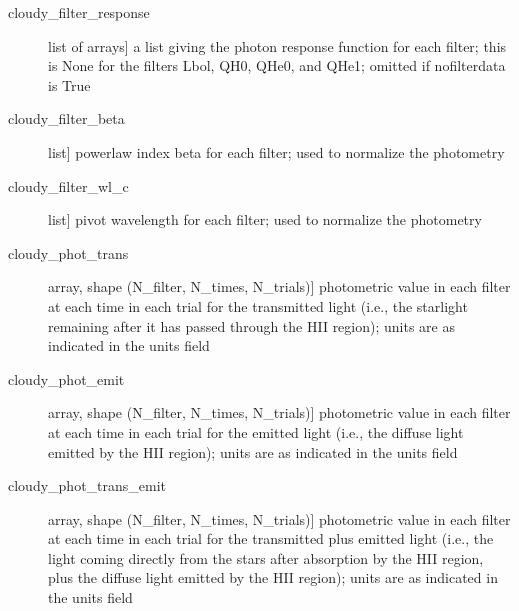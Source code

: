 \documentclass[letterpaper,10pt,english]{sphinxmanual}
\begin{document}
\begin{fulllineitems}
\begin{description}
\begin{description}
\item[{cloudy\_filter\_response}] \leavevmode{[}list of arrays{]}
a list giving the photon response function for each filter;
this is None for the filters Lbol, QH0, QHe0, and QHe1; omitted
if nofilterdata is True

\item[{cloudy\_filter\_beta}] \leavevmode{[}list{]}
powerlaw index beta for each filter; used to normalize the
photometry

\item[{cloudy\_filter\_wl\_c}] \leavevmode{[}list{]}
pivot wavelength for each filter; used to normalize the photometry

\item[{cloudy\_phot\_trans}] \leavevmode{[}array, shape (N\_filter, N\_times, N\_trials){]}
photometric value in each filter at each time in each trial for
the transmitted light (i.e., the starlight remaining after it
has passed through the HII region); units are as indicated in
the units field

\item[{cloudy\_phot\_emit}] \leavevmode{[}array, shape (N\_filter, N\_times, N\_trials){]}
photometric value in each filter at each time in each trial for
the emitted light (i.e., the diffuse light emitted by the HII
region); units are as indicated in the units field

\item[{cloudy\_phot\_trans\_emit}] \leavevmode{[}array, shape (N\_filter, N\_times, N\_trials){]}
photometric value in each filter at each time in each trial for
the transmitted plus emitted light (i.e., the light coming
directly from the stars after absorption by the HII region,
plus the diffuse light emitted by the HII region); units are as
indicated in the units field

\end{description}

\end{description}

\end{fulllineitems}

\end{document}
